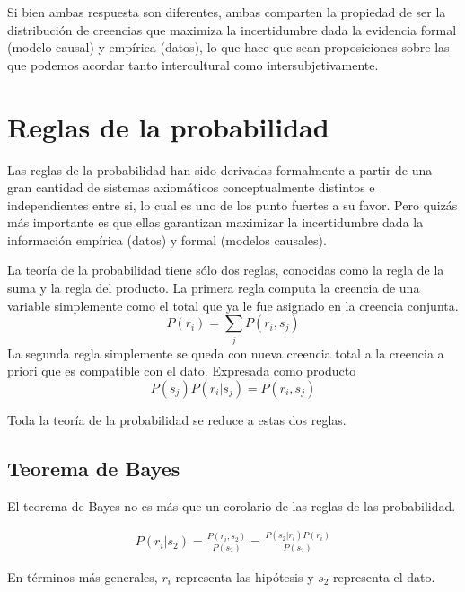 \documentclass[a4paper,10pt]{book}
\theoremstyle{definition}
\begin{document}
%  
Si bien ambas respuesta son diferentes, ambas comparten la propiedad de ser la distribución de creencias que maximiza la incertidumbre dada la evidencia formal (modelo causal) y empírica (datos), lo que hace que sean proposiciones sobre las que podemos acordar tanto intercultural como intersubjetivamente.

\section{Reglas de la probabilidad}

Las reglas de la probabilidad han sido derivadas formalmente a partir de una gran cantidad de sistemas axiomáticos conceptualmente distintos e independientes entre si, lo cual es uno de los punto fuertes a su favor.
Pero quizás más importante es que ellas garantizan maximizar la incertidumbre dada la información empírica (datos) y formal (modelos causales).


La teoría de la probabilidad tiene sólo dos reglas, conocidas como la regla de la suma y la regla del producto.
La primera regla computa la creencia de una variable simplemente como el total que ya le fue asignado en la creencia conjunta.
\begin{equation}
P(r_i) = \sum_j P(r_i, s_j)
\end{equation}
La segunda regla simplemente se queda con nueva creencia total a la creencia a priori que es compatible con el dato.
Expresada como producto
\begin{equation}
P(s_j)P(r_i|s_j) = P(r_i, s_j)
\end{equation}

Toda la teoría de la probabilidad se reduce a estas dos reglas.

\subsection{Teorema de Bayes}

El teorema de Bayes no es más que un corolario de las reglas de las probabilidad.

\begin{equation}
\begin{split}
P(r_i|s_2) = \frac{P(r_i, s_2)}{P(s_2)} = \frac{P(s_2|r_i)P(r_i)}{P(s_2)} 
\end{split}
\end{equation}

En términos más generales, $r_i$ representa las hipótesis y $s_2$ representa el dato.
\end{document}
